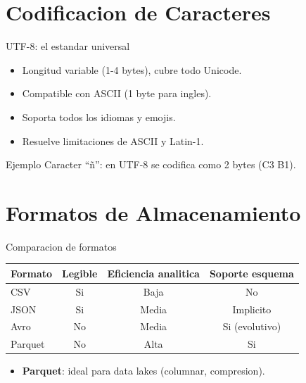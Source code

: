 \documentclass[aspectratio=169, 10pt, xcolor=table]{beamer}
\begin{document}
\section{Codificacion de Caracteres}

\begin{frame}{UTF-8: el estandar universal}
    \begin{itemize}
        \item Longitud variable (1-4 bytes), cubre todo Unicode.
        \item Compatible con ASCII (1 byte para ingles).
        \item Soporta todos los idiomas y emojis.
        \item Resuelve limitaciones de ASCII y Latin-1.
    \end{itemize}
    \begin{exampleblock}{Ejemplo}
        Caracter ``\~n'': en UTF-8 se codifica como 2 bytes (C3 B1).
    \end{exampleblock}
\end{frame}

\section{Formatos de Almacenamiento}

\begin{frame}{Comparacion de formatos}
    \begin{table}
        \centering
        \begin{tabular}{l|c|c|c}
            \toprule
            Formato & Legible & Eficiencia analitica & Soporte esquema \\
            \midrule
            CSV & Si & Baja & No \\
            JSON & Si & Media & Implicito \\
            Avro & No & Media & Si (evolutivo) \\
            Parquet & No & Alta & Si \\
            \bottomrule
        \end{tabular}
    \end{table}
    \begin{itemize}
        \item \textbf{Parquet}: ideal para data lakes (columnar, compresion).
    \end{itemize}
\end{frame}
\end{document}
